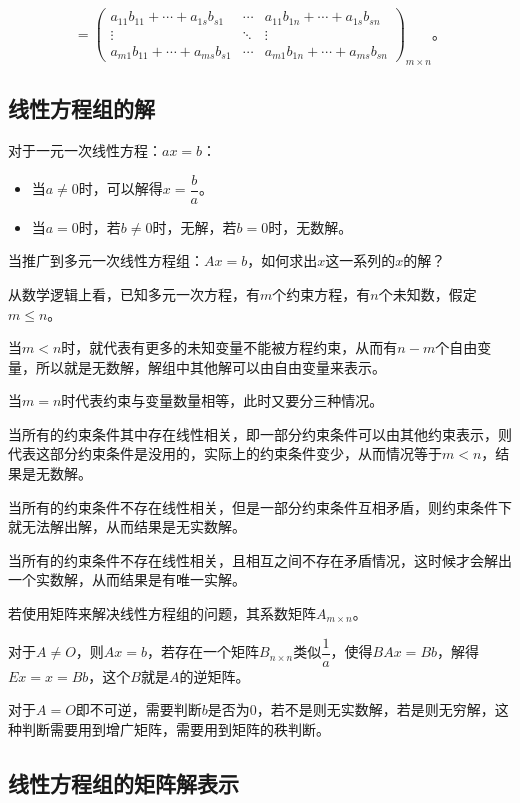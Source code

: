 \documentclass[UTF8, 12pt]{ctexart}
\begin{document}
$$=\left(\begin{array}{ccc}
    a_{11}b_{11}+\cdots+a_{1s}b_{s1} & \cdots & a_{11}b_{1n}+\cdots+a_{1s}b_{sn} \\
    \vdots & \ddots & \vdots \\
    a_{m1}b_{11}+\cdots+a_{ms}b_{s1} & \cdots & a_{m1}b_{1n}+\cdots+a_{ms}b_{sn}
\end{array}\right)_{m\times n}\text{。}$$

\subsection{线性方程组的解}

对于一元一次线性方程：$ax=b$：

\begin{itemize}
    \item 当$a\neq 0$时，可以解得$x=\dfrac{b}{a}$。
    \item 当$a=0$时，若$b\neq 0$时，无解，若$b=0$时，无数解。
\end{itemize}

当推广到多元一次线性方程组：$Ax=b$，如何求出$x$这一系列的$x$的解？

从数学逻辑上看，已知多元一次方程，有$m$个约束方程，有$n$个未知数，假定$m\leqslant n$。

当$m<n$时，就代表有更多的未知变量不能被方程约束，从而有$n-m$个自由变量，所以就是无数解，解组中其他解可以由自由变量来表示。

当$m=n$时代表约束与变量数量相等，此时又要分三种情况。

当所有的约束条件其中存在线性相关，即一部分约束条件可以由其他约束表示，则代表这部分约束条件是没用的，实际上的约束条件变少，从而情况等于$m<n$，结果是无数解。

当所有的约束条件不存在线性相关，但是一部分约束条件互相矛盾，则约束条件下就无法解出解，从而结果是无实数解。

当所有的约束条件不存在线性相关，且相互之间不存在矛盾情况，这时候才会解出一个实数解，从而结果是有唯一实解。

若使用矩阵来解决线性方程组的问题，其系数矩阵$A_{m\times n}$。

对于$A\neq O$，则$Ax=b$，若存在一个矩阵$B_{n\times n}$类似$\dfrac{1}{a}$，使得$BAx=Bb$，解得$Ex=x=Bb$，这个$B$就是$A$的逆矩阵。

对于$A=O$即不可逆，需要判断$b$是否为0，若不是则无实数解，若是则无穷解，这种判断需要用到增广矩阵，需要用到矩阵的秩判断。

\subsection{线性方程组的矩阵解表示}
\end{document}
